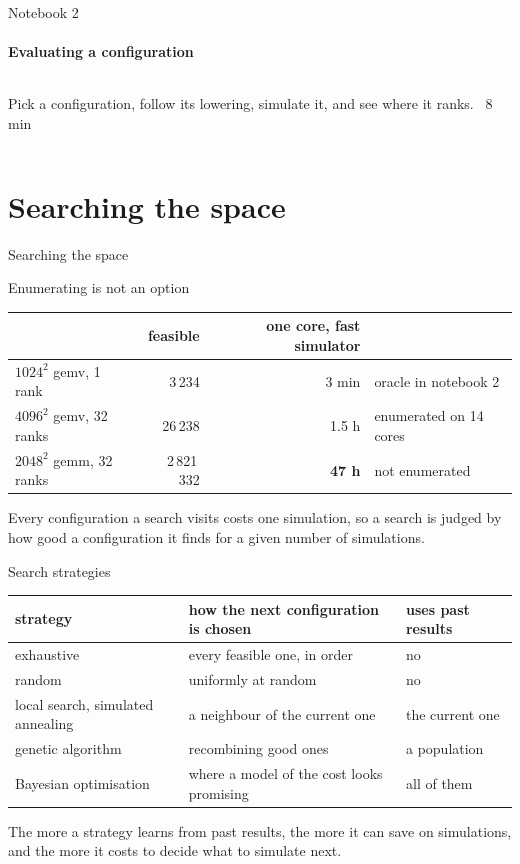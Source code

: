 \documentclass[aspectratio=169,11pt]{ccc-beamer}
\newcommand{\notebookframe}[3]{%
  \begin{frame}[sectionpage]{Notebook #1}
    \framesubtitle{#2}
    \begin{columns}
      \column{.66\textwidth}
      \column{.3\textwidth}
      \small #3
    \end{columns}
  \end{frame}}
\newcommand{\sectionframe}[1]{%
  \section{#1}
  \begin{frame}[sectionpage]{#1}
  \end{frame}}
\begin{document}
\notebookframe{2}{Evaluating a configuration}{Pick a configuration, follow its lowering, simulate it, and see where it ranks. \quad \faClock\ 8 min}

\sectionframe{Searching the space}

\begin{frame}{Enumerating is not an option}
  \centering
  \small
  \begin{tabular}{@{}lrrl@{}}
    \toprule
    & feasible & one core, fast simulator & \\
    \midrule
    $1024^2$ gemv, 1 rank & 3\,234 & 3 min & oracle in notebook 2 \\
    $4096^2$ gemv, 32 ranks & 26\,238 & 1.5 h & enumerated on 14 cores \\
    $2048^2$ gemm, 32 ranks & 2\,821\,332 & \textbf{47 h} & not enumerated \\
    \bottomrule
  \end{tabular}
  \bigskip

  Every configuration a search visits costs one simulation, so a search is judged by how good a configuration it finds for a given number of simulations.
\end{frame}

\begin{frame}{Search strategies}
  \centering\footnotesize
  \begin{tabular}{@{}p{}p{}p{}@{}}
    \toprule
    strategy & how the next configuration is chosen & uses past results \\
    \midrule
    exhaustive & every feasible one, in order & no \\
    random & uniformly at random & no \\
    local search, simulated annealing & a neighbour of the current one & the current one \\
    genetic algorithm & recombining good ones & a population \\
    Bayesian optimisation & where a model of the cost looks promising & all of them \\
    \bottomrule
  \end{tabular}
  \bigskip

  The more a strategy learns from past results, the more it can save on simulations, and the more it costs to decide what to simulate next.
\end{frame}
\end{document}
